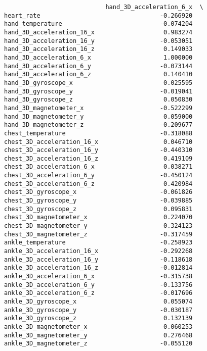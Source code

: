 \documentclass[11pt]{article}
\begin{document}
\begin{verbatim}
                            hand_3D_acceleration_6_x  \
heart_rate                                 -0.266920   
hand_temperature                           -0.074204   
hand_3D_acceleration_16_x                   0.983274   
hand_3D_acceleration_16_y                  -0.053051   
hand_3D_acceleration_16_z                   0.149033   
hand_3D_acceleration_6_x                    1.000000   
hand_3D_acceleration_6_y                   -0.073144   
hand_3D_acceleration_6_z                    0.140410   
hand_3D_gyroscope_x                         0.025595   
hand_3D_gyroscope_y                        -0.019041   
hand_3D_gyroscope_z                         0.050830   
hand_3D_magnetometer_x                     -0.522299   
hand_3D_magnetometer_y                      0.059000   
hand_3D_magnetometer_z                     -0.209677   
chest_temperature                          -0.318088   
chest_3D_acceleration_16_x                  0.046710   
chest_3D_acceleration_16_y                 -0.440310   
chest_3D_acceleration_16_z                  0.419109   
chest_3D_acceleration_6_x                   0.038271   
chest_3D_acceleration_6_y                  -0.450124   
chest_3D_acceleration_6_z                   0.420984   
chest_3D_gyroscope_x                       -0.061826   
chest_3D_gyroscope_y                       -0.039885   
chest_3D_gyroscope_z                        0.095831   
chest_3D_magnetometer_x                     0.224070   
chest_3D_magnetometer_y                     0.324123   
chest_3D_magnetometer_z                    -0.317459   
ankle_temperature                          -0.258923   
ankle_3D_acceleration_16_x                 -0.292268   
ankle_3D_acceleration_16_y                 -0.118618   
ankle_3D_acceleration_16_z                 -0.012814   
ankle_3D_acceleration_6_x                  -0.315738   
ankle_3D_acceleration_6_y                  -0.133756   
ankle_3D_acceleration_6_z                  -0.017696   
ankle_3D_gyroscope_x                        0.055074   
ankle_3D_gyroscope_y                       -0.030187   
ankle_3D_gyroscope_z                        0.132139   
ankle_3D_magnetometer_x                     0.060253   
ankle_3D_magnetometer_y                     0.276468   
ankle_3D_magnetometer_z                    -0.055120   


\end{verbatim}
\end{document}
